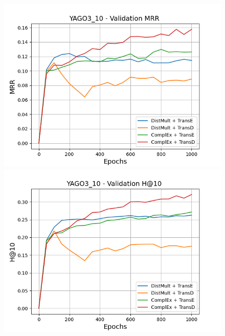 \begin{figure}[H]
    \centering
    \begin{minipage}{.45\textwidth}
      \centering
      \includegraphics[width=0.9\linewidth]{figures/results/gan_train/not_pretrained/uncertainty/max/entropy/yago3_10/1k_epochs/uncertainty_yago3_10_mrrs.png}
    \end{minipage}%
    \begin{minipage}{.45\textwidth}
      \centering
      \includegraphics[width=0.9\linewidth]{figures/results/gan_train/not_pretrained/uncertainty/max/entropy/yago3_10/1k_epochs/uncertainty_yago3_10_hit10.png}
    \end{minipage}
    

\end{figure}
